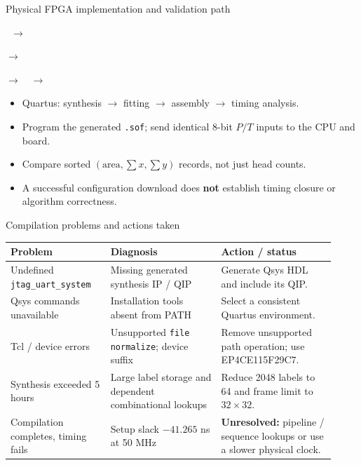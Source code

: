 \documentclass[aspectratio=169,10pt]{beamer}
\begin{document}
\begin{frame}{Physical FPGA implementation and validation path}
\begin{center}
\ $\longrightarrow$\ \par\medskip
$\longrightarrow$\ \par\medskip
$\longrightarrow$\ \ $\longrightarrow$\ 
\end{center}
\begin{itemize}
\item Quartus: synthesis $\rightarrow$ fitting $\rightarrow$ assembly $\rightarrow$ timing analysis.
\item Program the generated \texttt{.sof}; send identical 8-bit $P/T$ inputs to the CPU and board.
\item Compare sorted $(\mathrm{area},\sum x,\sum y)$ records, not just head counts.
\item A successful configuration download does \textbf{not} establish timing closure or algorithm correctness.
\end{itemize}
\end{frame}

\begin{frame}{Compilation problems and actions taken}
\small
\begin{tabular}{p{0.29\linewidth}p{0.31\linewidth}p{0.32\linewidth}}
\toprule
Problem & Diagnosis & Action / status \\
\midrule
Undefined \texttt{jtag\_uart\_system} & Missing generated synthesis IP / QIP & Generate Qsys HDL and include its QIP. \\
Qsys commands unavailable & Installation tools absent from PATH & Select a consistent Quartus environment. \\
Tcl / device errors & Unsupported \texttt{file normalize}; device suffix & Remove unsupported path operation; use EP4CE115F29C7. \\
Synthesis exceeded 5 hours & Large label storage and dependent combinational lookups & Reduce 2048 labels to 64 and frame limit to $32\times32$. \\
Compilation completes, timing fails & Setup slack $-41.265$ ns at 50 MHz & \textbf{Unresolved:} pipeline / sequence lookups or use a slower physical clock. \\
\bottomrule
\end{tabular}
\end{frame}
\end{document}
